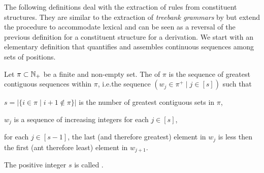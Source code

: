 \documentclass[../../document.tex]{subfiles}
\begin{document}
    \null\hfill
    \hfill
    \hfill\exampleqed

    \vspace{\baselineskip}

    The following definitions deal with the extraction of  rules from constituent structures.
    They are similar to the extraction of \emph{treebank grammars} by \citet{MaierSogaard08} but extend the procedure to accommodate lexical  and can be seen as a reversal of the previous definition for a constituent structure for a derivation.
    We start with an elementary definition that quantifies and assembles continuous sequences among sets of positions.

    \begin{definition}[Linearization]
        Let \(\pi \subset \mathbb{N}_+\) be a finite and non-empty set.
        The  of \(\pi\) is the sequence of greatest contiguous sequences within \(\pi\), i.e.\@ the sequence \((w_j \in \pi^+ \mid j \in [s])\) such that
        \begin{compactitem}
            \item \(s = |\{i \in \pi \mid i+1 \notin \pi\}|\) is the number of greatest contiguous sets in \(\pi\),
            \item \(w_j\) is a sequence of increasing integers for each \(j \in [s]\),
            \item for each \(j \in [s-1]\), the last (and therefore greatest) element in \(w_j\) is less then the first (ant therefore least) element in \(w_{j+1}\).
        \end{compactitem}
        The positive integer \(s\) is called .
    \end{definition}
\end{document}
